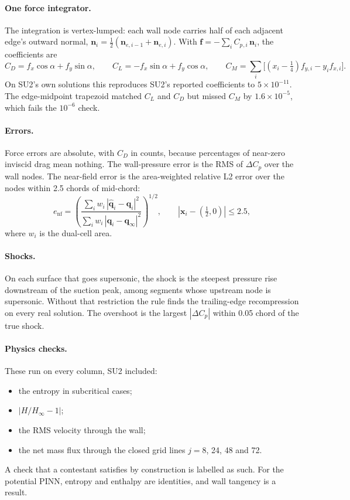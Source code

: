 \documentclass[11pt]{article}
\newcommand{\Cp}{C_p}
\newcommand{\CL}{C_L}
\newcommand{\CD}{C_D}
\newcommand{\CM}{C_M}
\begin{document}
\paragraph{One force integrator.}
The integration is vertex-lumped: each wall node carries half of each adjacent edge's outward
normal,
$\bm n_i = \tfrac12(\bm n_{e,i-1} + \bm n_{e,i})$. With $\bm f = -\sum_i \Cp{}_{,i}\,\bm n_i$, the
coefficients are
\begin{equation}
  \CD = f_x\cos\alpha + f_y\sin\alpha,\qquad
  \CL = -f_x\sin\alpha + f_y\cos\alpha,\qquad
  \CM = \sum_i\bigl[(x_i - \tfrac14)f_{y,i} - y_i f_{x,i}\bigr].
  \label{eq:forces}
\end{equation}
On SU2's own solutions this reproduces SU2's reported coefficients to $5\times10^{-11}$. The
edge-midpoint trapezoid matched $\CL$ and $\CD$ but missed $\CM$ by $1.6\times10^{-5}$, which fails
the $10^{-6}$ check.

\paragraph{Errors.}
Force errors are absolute, with $\CD$ in counts, because percentages of near-zero inviscid drag mean
nothing. The wall-pressure error is the RMS of $\Delta\Cp$ over the wall nodes. The near-field
error is the area-weighted relative L2 error over the nodes within 2.5 chords of mid-chord:
\begin{equation}
  e_{\mathrm{nf}} = \left(\frac{\sum_{i}w_i\,|\hat{\bm q}_i - \bm q_i|^2}{\sum_i w_i\,|\bm q_i - \bm q_\infty|^2}\right)^{1/2},
  \qquad |\bm x_i - (\tfrac12,0)|\le2.5,
  \label{eq:nearfield}
\end{equation}
where $w_i$ is the dual-cell area.

\paragraph{Shocks.}
On each surface that goes supersonic, the shock is the steepest pressure rise downstream of the
suction peak, among segments whose upstream node is supersonic. Without that restriction the rule
finds the trailing-edge recompression on every real solution. The overshoot is the largest
$|\Delta\Cp|$ within 0.05 chord of the true shock.

\paragraph{Physics checks.}
These run on every column, SU2 included:
\begin{itemize}
  \item the entropy in subcritical cases;
  \item $|H/H_\infty - 1|$;
  \item the RMS velocity through the wall;
  \item the net mass flux through the closed grid lines $j = 8$, 24, 48 and 72.
\end{itemize}
A check that a contestant satisfies by construction is labelled as such. For the potential PINN,
entropy and enthalpy are identities, and wall tangency is a result.
\end{document}
